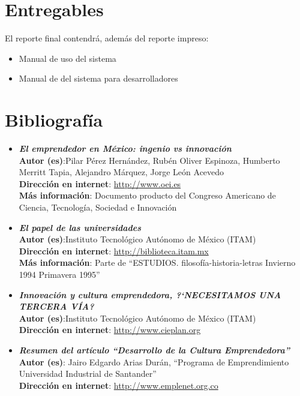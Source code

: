 \documentclass[12pt,letterpaper,titlepage]{article}
\begin{document}
\section{Entregables}

 El reporte final contendr\'a, adem\'as del reporte impreso:
\begin{itemize}
 \item Manual de uso del sistema
 \item Manual de del sistema para desarrolladores
 
\end{itemize}


\section{Bibliograf\'ia}
\begin{itemize}
 \item \textbf{\textit{El emprendedor en M\'exico: ingenio vs innovaci\'on}}\\
\textbf{Autor (es)}:Pilar P\'erez Hern\'andez, Rub\'en Oliver Espinoza, Humberto Merritt Tapia, Alejandro M\'arquez, Jorge Le\'on Acevedo\\
\textbf{Direcci\'on en internet}:  \href{http://www.oei.es/memoriasctsi/mesa12/m12p25.pdf}{http://www.oei.es}  \\
\textbf{M\'as informaci\'on}: Documento producto del  Congreso Americano de Ciencia, Tecnolog\'ia, Sociedad e Innovaci\'on

\item \textbf{\textit{El papel de las universidades}}\\
\textbf{Autor (es)}:Instituto Tecnológico Autónomo de México (ITAM)\\
\textbf{Direcci\'on en internet}:  \href{http://biblioteca.itam.mx/estudios/estudio/letras39-40/texto10/sec\_2.html}{http://biblioteca.itam.mx}\\
\textbf{M\'as informaci\'on}: Parte de ``ESTUDIOS. filosofía-historia-letras
Invierno 1994 Primavera 1995''

\item \textbf{\textit{Innovaci\'on y cultura emprendedora, ?`NECESITAMOS UNA TERCERA V\'IA?}}\\
\textbf{Autor (es)}:Instituto Tecnológico Autónomo de México (ITAM)\\
\textbf{Direcci\'on en internet}:  \href{http://www.cieplan.org/archivos/Capitulo\%20046.PDF}{http://www.cieplan.org}

\item \textbf{\textit{Resumen del art\'iculo ``Desarrollo de la Cultura Emprendedora''}}\\
\textbf{Autor (es)}: Jairo Edgardo Arias Durán, ``Programa de Emprendimiento Universidad Industrial de Santander''\\
\textbf{Direcci\'on en internet}:  
 \href{http://www.emplenet.org.co/roce/documentos/desarrollo\%20de\%20la\%20cultura\%20emprendedora.pdf}{http://www.emplenet.org.co}


\end{itemize}
\end{document}
